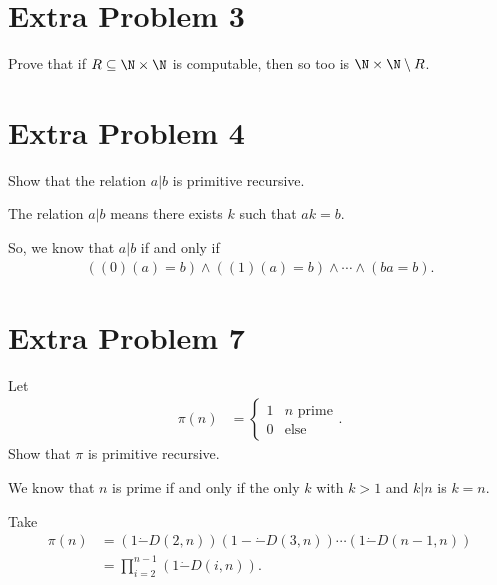\documentclass[10pt]{mypackage}
\begin{document}
\section{Extra Problem 3}%
\begin{problem}
  Prove that if $R\subseteq \N\times \N$ is computable, then so too is $\N\times \N\setminus R$.
\end{problem}
\section{Extra Problem 4}%
\begin{problem}
  Show that the relation $a|b$ is primitive recursive.
\end{problem}
\begin{solution}
  The relation $a|b$ means there exists $k$ such that $ak = b$.\newline

  So, we know that $a|b$ if and only if
  \begin{align*}
    \left(\left(0\right)\left(a\right) = b\right) \wedge \left(\left(1\right)\left(a\right) = b\right) \wedge \cdots \wedge \left(ba = b\right).
  \end{align*}
  
\end{solution}

\section{Extra Problem 7}%
\begin{problem}
  Let
  \begin{align*}
    \pi(n) &= \begin{cases}
      1 & \text{$n$ prime}\\
      0 & \text{else}
    \end{cases}.
  \end{align*}
  Show that $\pi$ is primitive recursive.
\end{problem}
\begin{solution}
  We know that $n$ is prime if and only if the only $k$ with $k > 1$ and $k | n$ is $k=n$.\newline

  Take
  \begin{align*}
    \pi\left(n\right) &= \left(1\dot{-}D\left(2,n\right)\right)\left(1-\dot{-}D\left(3,n\right)\right)\cdots \left(1\dot{-}D\left(n-1,n\right)\right)\\
                      &= \prod_{i=2}^{n-1}\left(1\dot{-}D\left(i,n\right)\right).
  \end{align*}
  
\end{solution}
\end{document}
